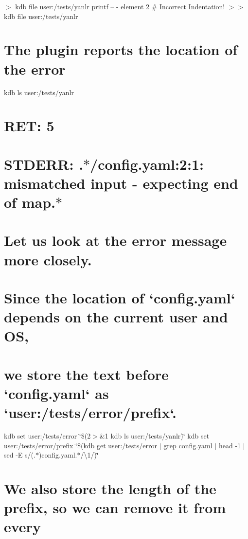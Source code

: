 \textquotesingle{} $>$ {\ttfamily kdb file user\+:/tests/yanlr} printf -- \textquotesingle{}-\/ element 2 \# Incorrect Indentation!\textquotesingle{} $>$$>$ {\ttfamily kdb file user\+:/tests/yanlr}\hypertarget{autotoc_md897_autotoc_md925}{}\section{The plugin reports the location of the error}\label{autotoc_md897_autotoc_md925}
kdb ls user\+:/tests/yanlr \hypertarget{autotoc_md897_autotoc_md926}{}\section{R\+E\+T\+: 5}\label{autotoc_md897_autotoc_md926}
\hypertarget{autotoc_md897_autotoc_md927}{}\section{S\+T\+D\+E\+R\+R\+: .$\ast$/config.\+yaml\+:2\+:1\+: mismatched input \textquotesingle{}-\/ \textquotesingle{} expecting end of map.$\ast$}\label{autotoc_md897_autotoc_md927}
\hypertarget{autotoc_md897_autotoc_md928}{}\section{Let us look at the error message more closely.}\label{autotoc_md897_autotoc_md928}
\hypertarget{autotoc_md897_autotoc_md929}{}\section{Since the location of `config.\+yaml` depends on the current user and O\+S,}\label{autotoc_md897_autotoc_md929}
\hypertarget{autotoc_md897_autotoc_md930}{}\section{we store the text before `config.\+yaml` as `user\+:/tests/error/prefix`.}\label{autotoc_md897_autotoc_md930}
kdb set user\+:/tests/error \char`\"{}\$(2$>$\&1 kdb ls user\+:/tests/yanlr)\char`\"{} kdb set user\+:/tests/error/prefix \char`\"{}\$(kdb get user\+:/tests/error $\vert$ grep \textquotesingle{}config.\+yaml\textquotesingle{} $\vert$ head -\/1 $\vert$ sed -\/\+E \textquotesingle{}s/(.$\ast$)config.\+yaml.$\ast$/\textbackslash{}1/\textquotesingle{})\char`\"{} \hypertarget{autotoc_md897_autotoc_md931}{}\section{We also store the length of the prefix, so we can remove it from every}\label{autotoc_md897_autotoc_md931}
$$
